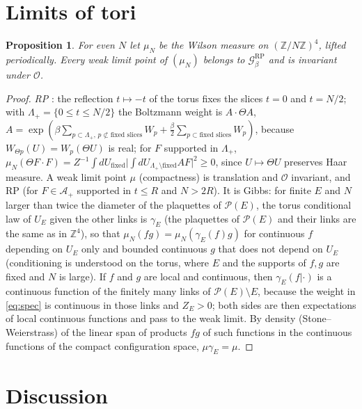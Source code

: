 \documentclass[11pt,a4paper]{article}
\theoremstyle{plain}
\newtheorem{proposition}[theorem]{Proposition}
\theoremstyle{definition}
\theoremstyle{remark}
\numberwithin{equation}{section}
\newcommand{\Z}{\mathbb{Z}}
\newcommand{\cP}{\mathcal{P}}
\newcommand{\cG}{\mathcal{G}}
\newcommand{\cO}{\mathcal{O}}
\newcommand{\Th}{\Theta}
\begin{document}
\section{Limits of tori}\label{sec:tori}

\begin{proposition}\label{prop:tori}
For even $N$ let $\mu_N$ be the Wilson measure on $(\Z/N\Z)^4$, lifted periodically. Every weak limit point of $(\mu_N)$ belongs to
$\cG^{\mathrm{RP}}_\beta$ and is invariant under $\cO$.
\end{proposition}
\begin{proof}
\emph{RP} \cite{OS78}: the reflection $t\mapsto-t$ of the torus fixes the slices $t=0$ and $t=N/2$; with $\Lambda_+=\{0\le t\le N/2\}$ the
Boltzmann weight is $A\cdot\Th A$, $A=\exp(\beta\sum_{p\subset\Lambda_+,\,p\not\subset\text{fixed slices}}W_p+\frac\beta2\sum_{p\subset\text{fixed
slices}}W_p)$, because $W_{\Th p}(U)=W_p(\Th U)$ is real; for $F$ supported in $\Lambda_+$,
$\mu_N(\Th F\cdot F)=Z^{-1}\int dU_{\text{fixed}}\bigl|\int dU_{\Lambda_+\setminus\text{fixed}}AF\bigr|^2\ge0$, since $U\mapsto\Th U$ preserves Haar
measure. A weak limit point $\mu$ (compactness) is translation and $\cO$ invariant, and RP (for $F\in\mathcal A_+$ supported in $t\le R$ and
$N>2R$). It is Gibbs: for finite $E$ and $N$ larger than twice the diameter of the plaquettes of $\cP(E)$, the torus conditional law of $U_E$ given the other links is $\gamma_E$ (the plaquettes of $\cP(E)$ and their links
are the same as in $\Z^4$), so that $\mu_N(fg)=\mu_N(\gamma_E(f)g)$ for continuous $f$ depending on $U_E$ only and bounded continuous $g$ that does not depend on $U_E$ (conditioning is understood on the torus, where $E$ and the supports of $f,g$ are fixed and $N$ is large). If $f$ and $g$ are local and continuous, then $\gamma_E(f|\cdot)$ is a continuous function of the finitely many links of
$\cP(E)\setminus E$, because the weight in \eqref{eq:spec} is continuous in those links and $Z_E>0$; both sides are then expectations of local continuous functions and pass to the weak limit. By density (Stone--Weierstrass) of the linear span of products $fg$ of such functions
in the continuous functions of the compact configuration space, $\mu\gamma_E=\mu$.
\end{proof}

\section{Discussion}\label{sec:discussion}
\end{document}
